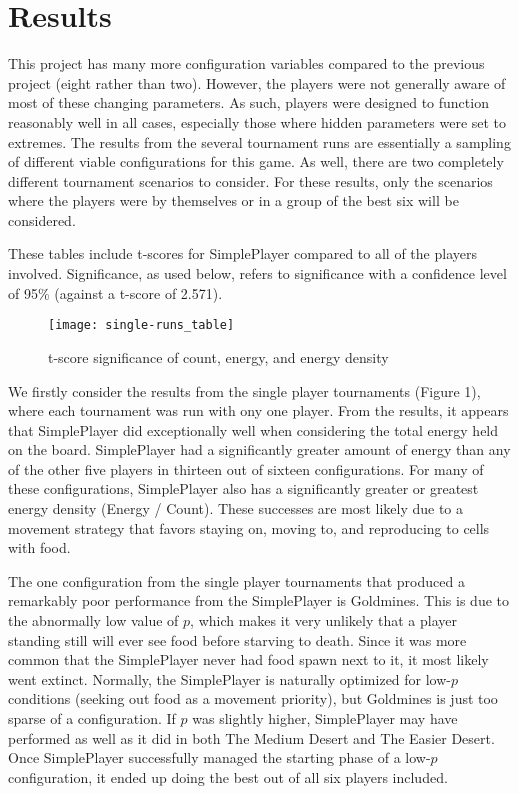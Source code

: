 \documentclass[
10pt, %
letterpaper, %
oneside, %
headinclude,footinclude, %
english
]{article}
\begin{document}
\section{Results}
This project has many more configuration variables compared to the previous project (eight rather than two). However, the players were not generally aware of most of these changing parameters. As such, players were designed to function reasonably well in all cases, especially those where hidden parameters were set to extremes. The results from the several tournament runs are essentially a sampling of different viable configurations for this game. As well, there are two completely different tournament scenarios to consider. For these results, only the scenarios where the players were by themselves or in a group of the best six will be considered.

These tables include t-scores for SimplePlayer compared to all of the players involved. Significance, as used below, refers to significance with a confidence level of 95\% (against a t-score of 2.571).

\begin{figure}[h]
\centering
\texttt{[image: single-runs\_table]}
\caption[Table of t-score statistics for Single Run Tournaments]{t-score significance of count, energy, and energy density}
\label{fig:gallery2}
\end{figure}

We firstly consider the results from the single player tournaments (Figure 1), where each tournament was run with ony one player. From the results, it appears that SimplePlayer did exceptionally well when considering the total energy held on the board. SimplePlayer had a significantly greater amount of energy than any of the other five players in thirteen out of sixteen configurations. For many of these configurations, SimplePlayer also has a significantly greater or greatest energy density (Energy / Count). These successes are most likely due to a movement strategy that favors staying on, moving to, and reproducing to cells with food.

The one configuration from the single player tournaments that produced a remarkably poor performance from the SimplePlayer is Goldmines. This is due to the abnormally low value of $p$, which makes it very unlikely that a player standing still will ever see food before starving to death. Since it was more common that the SimplePlayer never had food spawn next to it, it most likely went extinct. Normally, the SimplePlayer is naturally optimized for low-$p$ conditions (seeking out food as a movement priority), but Goldmines is just too sparse of a configuration. If $p$ was slightly higher, SimplePlayer may have performed as well as it did in both The Medium Desert and The Easier Desert. Once SimplePlayer successfully managed the starting phase of a low-$p$ configuration, it ended up doing the best out of all six players included.
\end{document}
